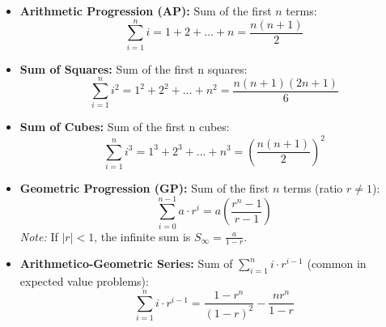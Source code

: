 
\begin{itemize}
    \item \textbf{Arithmetic Progression (AP):}
    Sum of the first $n$ terms:
    \[ \sum_{i=1}^{n} i = 1 + 2 + \dots + n = \frac{n(n+1)}{2} \]

    \item \textbf{Sum of Squares:}
    Sum of the first n squares:
    \[ \sum_{i=1}^{n} i^2 = 1^2 + 2^2 + \dots + n^2 = \frac{n(n+1)(2n+1)}{6} \]

    \item \textbf{Sum of Cubes:}
    Sum of the first n cubes:
    \[ \sum_{i=1}^{n} i^3 = 1^3 + 2^3 + \dots + n^3 = \left( \frac{n(n+1)}{2} \right)^2 \]

    \item \textbf{Geometric Progression (GP):}
    Sum of the first $n$ terms (ratio $r \neq 1$):
    \[ \sum_{i=0}^{n-1} a \cdot r^i = a \left( \frac{r^n - 1}{r - 1} \right) \]
    \textit{Note:} If $|r| < 1$, the infinite sum is $S_{\infty} = \frac{a}{1-r}$.

    \item \textbf{Arithmetico-Geometric Series:}
    Sum of $\sum_{i=1}^{n} i \cdot r^{i-1}$ (common in expected value problems):
    \[ \sum_{i=1}^{n} i \cdot r^{i-1} = \frac{1 - r^n}{(1-r)^2} - \frac{n r^n}{1-r} \]

\end{itemize}